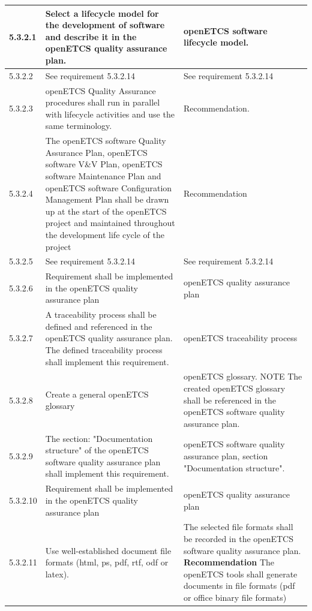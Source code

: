 \documentclass{template/openetcs_report}
\begin{document}
{\begin{longtable}{|p{2cm}|p{9cm}|p{3cm}|}
5.3.2.1 & Select a lifecycle model for the development of software and describe it in the openETCS quality assurance plan.
& openETCS software lifecycle model.\\ 
\hline
5.3.2.2 & See requirement 5.3.2.14 & See requirement 5.3.2.14\\ 
\hline
5.3.2.3 & openETCS Quality Assurance procedures shall run in parallel with lifecycle activities and use the same terminology. & Recommendation.\\ 
\hline
5.3.2.4 & The openETCS software Quality Assurance Plan, openETCS software V\&V Plan, openETCS software Maintenance Plan and openETCS software Configuration Management Plan shall be drawn up at the start of the openETCS project and maintained throughout the development life cycle of the project & Recommendation\\ 
\hline
5.3.2.5 & See requirement 5.3.2.14 & See requirement 5.3.2.14\\
\hline
5.3.2.6 & Requirement shall be implemented in the  openETCS quality assurance plan & openETCS quality assurance plan\\ 
\hline
5.3.2.7 & A traceability process shall be defined and referenced in the openETCS quality assurance plan. The defined traceability process shall implement this requirement.& openETCS traceability process\\ 
\hline
5.3.2.8 & Create a general openETCS glossary & openETCS glossary.
\linebreak
\linebreak
NOTE\linebreak
The created openETCS glossary shall be referenced in the openETCS software quality assurance plan.\\ 
\hline
5.3.2.9 & The section: "Documentation structure" of the openETCS software quality assurance plan shall implement this requirement. & openETCS software quality assurance plan, section "Documentation structure".\\ 
\hline
5.3.2.10 & Requirement shall be implemented in the  openETCS quality assurance plan & openETCS quality assurance plan\\ 
\hline
5.3.2.11 & Use well-established document file formats (html, ps, pdf, rtf, odf or latex).
& The selected file formats shall be recorded in the openETCS software quality assurance plan.
\linebreak
\linebreak
\textbf{Recommendation}\linebreak
The openETCS tools shall generate documents in file formats (pdf or office binary file formats)\\ 

\end{longtable}}
\end{document}
